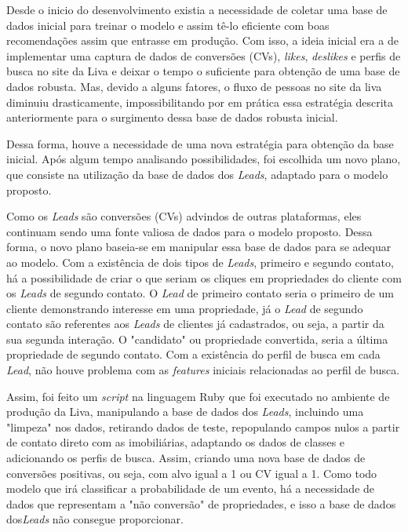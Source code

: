 Desde o inicio do desenvolvimento existia a necessidade de coletar uma base de dados inicial para treinar o modelo e assim tê-lo eficiente com boas recomendações assim que entrasse em produção. Com isso, a ideia inicial era a de implementar uma captura de dados de conversões (CVs), \textit{likes}, \textit{deslikes} e perfis de busca no site da Liva e deixar o tempo o suficiente para obtenção de uma base de dados robusta. Mas, devido a alguns fatores, o fluxo de pessoas no site da liva diminuiu drasticamente, impossibilitando por em prática essa estratégia descrita anteriormente para o surgimento dessa base de dados robusta inicial.

Dessa forma, houve a necessidade de uma nova estratégia para obtenção da base inicial. Após algum tempo analisando possibilidades, foi escolhida um novo plano, que consiste na utilização da base de dados dos \textit{Leads}, adaptado para o modelo proposto.

Como os \textit{Leads} são conversões (CVs) advindos de outras plataformas, eles continuam sendo uma fonte valiosa de dados para o modelo proposto. Dessa forma, o novo plano baseia-se em manipular essa base de dados para se adequar ao modelo. Com a existência de dois tipos de \textit{Leads}, primeiro e segundo contato, há a possibilidade de criar o que seriam os cliques em propriedades do cliente com os \textit{Leads} de segundo contato. O \textit{Lead} de primeiro contato seria o primeiro de um cliente demonstrando interesse em uma propriedade, já o \textit{Lead} de segundo contato são referentes aos \textit{Leads} de clientes já cadastrados, ou seja, a partir da sua segunda interação. O "candidato" ou propriedade convertida, seria a última propriedade de segundo contato. Com a  existência do perfil de busca em cada \textit{Lead}, não houve problema com as \textit{features} iniciais relacionadas ao perfil de busca.

Assim, foi feito um \textit{script} na linguagem Ruby que foi executado no ambiente de produção da Liva, manipulando a base de dados dos \textit{Leads}, incluindo uma "limpeza" nos dados, retirando dados de teste, repopulando campos nulos a partir de contato direto com as imobiliárias, adaptando os dados de classes e adicionando os perfis de busca. Assim, criando uma nova base de dados de conversões positivas, ou seja, com alvo igual a 1 ou CV igual a 1. Como todo modelo que irá classificar a probabilidade de um evento, há a necessidade de dados que representam a "não conversão" de propriedades, e isso a base de dados dos\textit{Leads} não consegue proporcionar.

